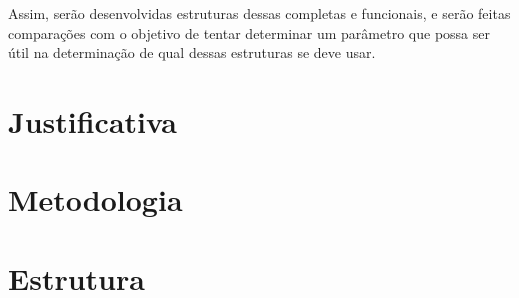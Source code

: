 Assim, serão desenvolvidas estruturas dessas completas e 
funcionais, e serão feitas comparações com o objetivo de 
tentar determinar um parâmetro que possa ser útil na 
determinação de qual dessas estruturas se deve usar.

\section{Justificativa}

\cite{callanandevops}


\section{Metodologia}

\section{Estrutura}